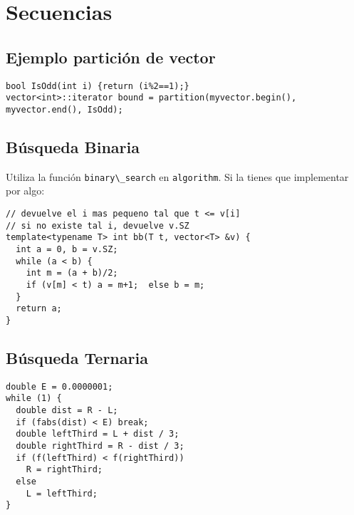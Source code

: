 \documentclass[10pt, a4, oneside]{article}
\begin{document}
\section{Secuencias}
\subsection{Ejemplo partición de vector}
\begin{verbatim}
bool IsOdd(int i) {return (i%2==1);}
vector<int>::iterator bound = partition(myvector.begin(), myvector.end(), IsOdd);
\end{verbatim}

\subsection{Búsqueda Binaria}
Utiliza la función \verb-binary\_search- en \verb-algorithm-. Si la tienes que
implementar por algo:
\begin{verbatim}
// devuelve el i mas pequeno tal que t <= v[i]
// si no existe tal i, devuelve v.SZ
template<typename T> int bb(T t, vector<T> &v) {
  int a = 0, b = v.SZ;
  while (a < b) {
    int m = (a + b)/2;
    if (v[m] < t) a = m+1;  else b = m;
  }
  return a;
}
\end{verbatim}
\subsection{Búsqueda Ternaria}
\begin{verbatim}
double E = 0.0000001;
while (1) {
  double dist = R - L;
  if (fabs(dist) < E) break;
  double leftThird = L + dist / 3;
  double rightThird = R - dist / 3;
  if (f(leftThird) < f(rightThird))
    R = rightThird;
  else
    L = leftThird;
}
\end{verbatim}
\end{document}
